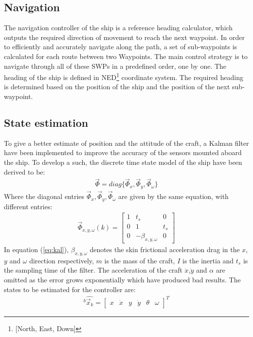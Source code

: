 \documentclass[journal]{IEEEtran}
\begin{document}
\subsection{Navigation}

The navigation controller of the ship is a reference heading calculator, which outputs the required direction of movement to reach the next waypoint. In order to efficiently and accurately navigate along the path, a set of sub-waypoints is calculated for each route between two Waypoints. The main control strategy is to navigate through all of these SWPs in a predefined order, one by one. The heading of the ship is defined in NED\footnote[1]{[North, East, Down]} coordinate system. The required heading is determined based on the position of the ship and the position of the next sub-waypoint.

\subsection{State estimation}
To give a better estimate of position and the attitude of the craft, a Kalman filter have been implemented to improve the accuracy of the sensors mounted aboard the ship. To develop a such, the discrete time state model of the ship have been derived to be:
\begin{align}
\vec{\Phi} = diag\{\vec{\Phi} _x,\vec{\Phi} _y,\vec{\Phi} _\omega\}
\end{align}
Where the diagonal entries $\vec{\Phi} _x,\vec{\Phi} _y,\vec{\Phi} _\omega$ are given by the same equation, with different entries:
\begin{align}
\vec{\Phi}_{x,y,\omega}(k) = \begin{bmatrix}
1 & t_s & 0\\
0 & 1 & t_s\\
0 & -\beta_{x,y,\omega} & 0
\end{bmatrix}
\label{eq:kal}
\end{align}
In equation (\ref{eq:kal}), $\beta_{x,y,\omega}$ denotes the skin frictional acceleration drag in the $x$,$y$ and $\omega$ direction respectively, $m$ is the mass of the craft, $I$ is the inertia and $t_s$ is the sampling time of the filter. The acceleration of the craft $\ddot{x}$,$\ddot{y}$ and $\alpha$ are omitted as the error grows exponentially which have produced bad results. The states to be estimated for the controller are:
\begin{align}
^b\hat{\vec{x}_k} = \begin{bmatrix}
x & \dot{x} & y & \dot{y} & \theta & \omega
\end{bmatrix}^T
\end{align}
\end{document}

